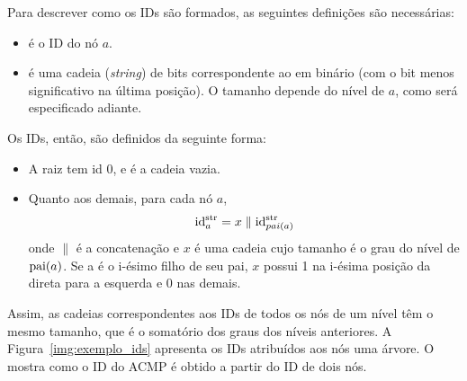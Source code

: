 Para descrever como os IDs são formados, as seguintes definições são necessárias:
\begin{itemize}
	\item {} é o ID do nó $a$.
	\item {} é uma cadeia (\textit{string}) de bits correspondente ao  em binário (com o bit menos significativo na última posição). O tamanho depende do nível de $a$, como será especificado adiante.
\end{itemize}
Os IDs, então, são definidos da seguinte forma:
\begin{itemize}
	\item A raiz tem id 0, e  é a cadeia vazia.
	\item Quanto aos demais, para cada nó $a$,
		$$\mathrm{id}_{a}^{\mathrm{str}} = x \parallel \mathrm{id}_{pai(a)}^{\mathrm{str}}$$
	onde $\parallel$ é a concatenação e $x$ é uma cadeia cujo tamanho é o grau do nível de $\operatorname{pai}(a)$.
	Se a é o i-ésimo filho de seu pai, $x$ possui 1 na i-ésima posição da direta para a esquerda e 0 nas demais.
\end{itemize}

Assim, as cadeias correspondentes aos IDs de todos os nós de um nível têm o mesmo tamanho, que é o somatório dos graus dos níveis anteriores.
A Figura~\ref{img:exemplo_ids} apresenta os IDs atribuídos aos nós uma árvore.
O  mostra como o ID do ACMP é obtido a partir do ID de dois nós.

